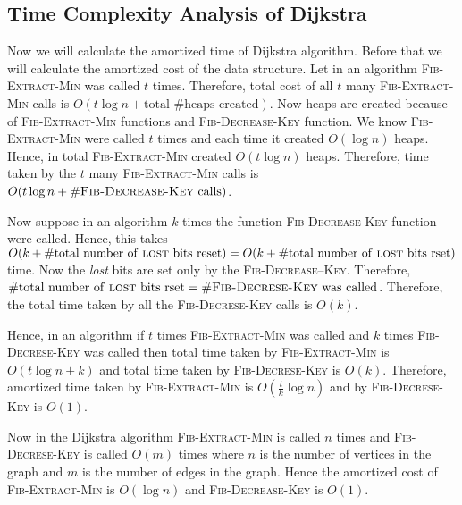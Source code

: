 \subsection{Time Complexity Analysis of Dijkstra}

Now we will calculate the amortized time of Dijkstra algorithm. Before that we will calculate the amortized cost of the data structure. Let in an algorithm  \textsc{Fib-Extract-Min} was called $t$ times. Therefore, total cost of all $t$ many \textsc{Fib-Extract-Min} calls is $O(t\log n+\text{total $\#$heaps created})$. Now heaps are created because of \textsc{Fib-Extract-Min} functions and \textsc{Fib-Decrease-Key} function. We know \textsc{Fib-Extract-Min} were called $t$ times and each time it created $O(\log n)$ heaps. Hence, in total \textsc{Fib-Extract-Min} created $O(t\log n)$ heaps. Therefore, time taken by the $t$ many \textsc{Fib-Extract-Min} calls is $O(t\log n+\#\textsc{Fib-Decrease-Key}\text{ calls})$.

Now suppose in an algorithm $k$ times the function \textsc{Fib-Decrease-Key} function were called. Hence, this takes $O(k+\#\text{total number of \textsc{lost} bits reset})=O(k+\#\text{total number of \textsc{lost} bits rset})$ time. Now the \emph{lost} bits are set only by the \textsc{Fib-Decrease--Key}. Therefore, $\#\text{total number of \textsc{lost} bits rset}=\#\text{\textsc{Fib-Decrese-Key} was called}$. Therefore, the total time taken by all the \textsc{Fib-Decrese-Key} calls is $O(k)$. 

Hence, in an algorithm if $t$ times \textsc{Fib-Extract-Min} was called and $k$ times \textsc{Fib-Decrese-Key} was called then total time taken by \textsc{Fib-Extract-Min} is $O(t\log n+k)$ and total time taken by \textsc{Fib-Decrese-Key} is $O(k)$. Therefore, amortized time taken by \textsc{Fib-Extract-Min} is $O(\frac{t}{k}\log n)$ and by \textsc{Fib-Decrese-Key} is $O(1)$. 

Now in the Dijkstra algorithm \textsc{Fib-Extract-Min} is called $n$ times and \textsc{Fib-Decrese-Key} is called $O(m)$ times where $n$ is the number of vertices in the graph and $m$ is the number of edges in the graph. Hence the amortized cost of \textsc{Fib-Extract-Min} is $O(\log n)$ and \textsc{Fib-Decrease-Key} is $O(1)$.
